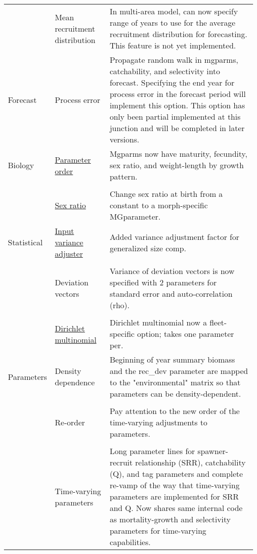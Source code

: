 \documentclass[12pt]{article}
\begin{document}
\begin{center}
\begin{longtable}{p{2cm} p{3cm} p{10cm}}
	\\					
	& Mean recruitment distribution & 
	In multi-area model, can now specify range of years to use for the average recruitment distribution for forecasting. This feature is not yet implemented. \\
	Forecast & 
	Process error & 
	Propagate random walk in mgparms, catchability, and selectivity into forecast. Specifying the end year for process error in the forecast period will implement this option.  This option has only been partial implemented at this junction and will be completed in later versions.\\
	\hline
	Biology 
	& \hyperlink{MGorder}{Parameter order} & 
	Mgparms now have maturity, fecundity, sex ratio, and weight-length by growth pattern.\\
	\\						
	& \hyperlink{SexRatio}{Sex ratio} & 
	Change sex ratio at birth from a constant to a morph-specific MGparameter. \\
	\hline
	Statistical 
	& \hyperlink{GcompVar}{Input variance adjuster} & 
	Added variance adjustment factor for generalized size comp. \\
	\\						
	& Deviation vectors & 
	Variance of deviation vectors is now specified with 2 parameters for standard error and auto-correlation (rho).\\
	\\						
	& \hyperlink{Dirichlet}{Dirichlet multinomial} & 
	Dirichlet multinomial now a fleet-specific option; takes one parameter per. \\
	\hline
	Parameters 
	& Density dependence & 
	Beginning of year summary biomass and the rec\_dev parameter are mapped to the    "environmental" matrix so that parameters can be density-dependent.\\
	\\						
	& Re-order & 
	Pay attention to the new order of the time-varying adjustments to parameters. \\
	\\						
	& Time-varying parameters & 
	Long parameter lines for spawner-recruit relationship (SRR), catchability (Q), and tag parameters and complete re-vamp of the way that time-varying parameters are implemented for SRR and Q.  Now shares same internal code as mortality-growth and selectivity parameters for time-varying capabilities.\\
	\hline		
	\end{longtable}
\end{center}
\end{document}
